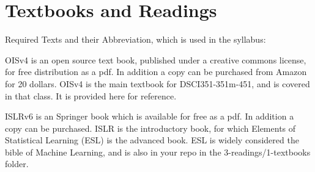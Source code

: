 \documentclass[11pt]{article} %
\begin{document}

\section{Textbooks and Readings}

  Required Texts and their Abbreviation, which is used in the syllabus: 
  	
  OISv4 is an open source text book, published under a creative commons license, for free distribution as a pdf. 
  In addition a copy can be purchased from Amazon for 20 dollars. 
  OISv4 is the main textbook for DSCI351-351m-451, and is covered in that class. 
  It is provided here for reference. 
  
  ISLRv6 is an Springer book which is available for free as a pdf. 
  In addition a copy can be purchased. 
  ISLR is the introductory book, for which Elements of Statistical Learning (ESL) is the advanced book.  
  ESL is widely considered the bible of Machine Learning, and is also in your repo in the 3-readings/1-textbooks folder.
  
\end{document}
